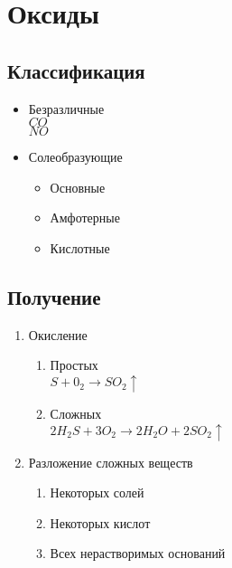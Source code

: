 \newpage
\section{Оксиды}
\subsection{Классификация}
\begin{itemize}
    \item Безразличные\\
    $CO$\\
    $NO$

    \item Солеобразующие
    \begin{itemize}
        \item Основные   
        \item Амфотерные 
        \item Кислотные  
    \end{itemize}
\end{itemize}



\subsection{Получение}
\begin{enumerate}
    \item Окисление
    \begin{enumerate}
        \item Простых\\
            $S + 0_2 \rightarrow SO_2\uparrow$
        \item Сложных\\
            $2H_2S + 3O_2 \rightarrow 2H_2O + 2SO_2\uparrow$
    \end{enumerate}

    \item Разложение сложных веществ
    \begin{enumerate}
        \item Некоторых солей
        \item Некоторых кислот
        \item Всех нерастворимых оснований\\
    \end{enumerate}
\end{enumerate}



